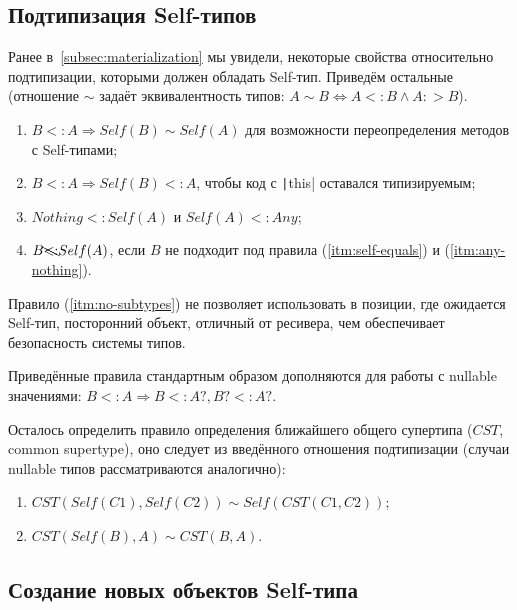 

\subsection{Подтипизация Self-типов} \label{subsec:self-subtyping}

Ранее в~\ref{subsec:materialization} мы увидели, некоторые свойства относительно подтипизации, которыми должен обладать Self-тип.
Приведём остальные (отношение $\sim$ задаёт эквивалентность типов: $A \sim B \iff A <: B \land A :> B$).

\begin{enumerate}
    \item \label{itm:self-equals} $B <: A \Rightarrow Self(B) \sim Self(A)$ для возможности переопределения методов с Self-типами;
    \item \label{itm:this-subtype} $B <: A \Rightarrow Self(B) <: A$, чтобы код с \texttt|this| оставался типизируемым;
    \item \label{itm:any-nothing} $Nothing <: Self(A)$ и $Self(A) <: Any$;
    \item \label{itm:no-subtypes} $B \bcancel{<:} Self(A)$, если $B$ не подходит под правила (\ref{itm:self-equals}) и (\ref{itm:any-nothing}).
\end{enumerate}

Правило (\ref{itm:no-subtypes}) не позволяет использовать в позиции, где ожидается Self-тип, посторонний объект, отличный от ресивера, чем обеспечивает безопасность системы типов.

Приведённые правила стандартным образом дополняются для работы с nullable значениями:
$B <: A \Rightarrow B <: A?, B? <: A?$.

Осталось определить правило определения ближайшего общего супертипа ($CST$, common supertype), оно следует из введённого отношения подтипизации (случаи nullable типов рассматриваются аналогично):
\begin{enumerate}
    \item $CST(Self(C1), Self(C2)) \sim Self(CST(C1, C2))$;
    \item $CST(Self(B), A) \sim CST(B, A)$.
\end{enumerate}


\subsection{Создание новых объектов Self-типа} \label{subsec:new}

